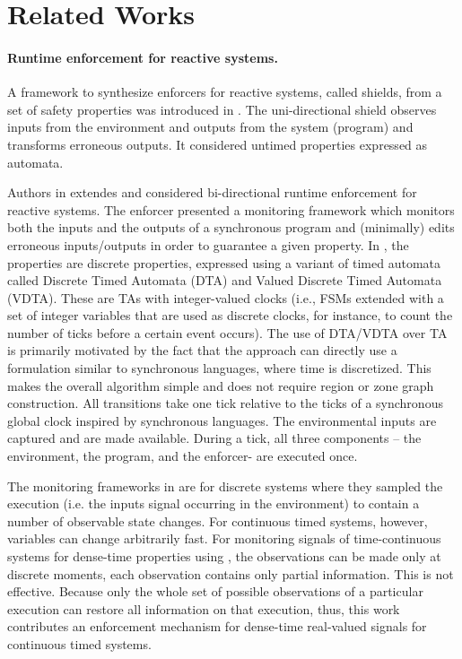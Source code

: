 \section{Related Works}
\label{sec:RL}
\paragraph{Runtime enforcement for reactive systems.}
A framework to synthesize enforcers for reactive systems, called shields, from a set of safety properties was introduced in \cite{10.1007/978-3-662-46681-0_51}. The uni-directional shield observes inputs from the environment and outputs from the system (program) and transforms erroneous outputs. It considered untimed properties expressed as automata. 

Authors in \cite{10.1145/3126500,10.1145/3092282.3092291,10.1109/TII.2019.2945520} extendes \cite{10.1007/978-3-662-46681-0_51} and considered bi-directional runtime enforcement for reactive systems. The enforcer presented a monitoring framework which monitors both the inputs and the outputs of a synchronous program and (minimally) edits erroneous inputs/outputs in order to guarantee a given property.  In \cite{10.1145/3092282.3092291,10.1109/TII.2019.2945520}, the properties are discrete properties, expressed using a variant of timed automata  %
called Discrete Timed Automata (DTA) and Valued Discrete Timed Automata (VDTA). These are TAs with integer-valued clocks (i.e., FSMs extended with a set of integer variables that are used as discrete clocks, for instance, to count the number of ticks before a certain event occurs).  The use of DTA/VDTA over TA is primarily motivated by the fact that the approach can directly use a formulation similar to synchronous languages, where time is discretized. This makes the overall algorithm simple and does not require region or zone graph construction. All transitions take one tick relative to the ticks of a synchronous global clock inspired by synchronous languages. The environmental inputs are captured %
and are made available. %
During a tick, all three components – the environment, the program, and the enforcer- are executed once. 


The monitoring frameworks in \cite{10.1145/3092282.3092291,10.1109/TII.2019.2945520} are for discrete systems where they sampled the execution (i.e. the inputs signal occurring in the environment) to contain a number of observable state changes. For continuous timed systems, however, variables can change arbitrarily fast. For monitoring signals of time-continuous systems for dense-time properties using \cite{10.1145/3092282.3092291,10.1109/TII.2019.2945520}, the observations can be made only at discrete moments, each observation contains only partial information. This is not effective. Because only the whole set of possible observations of a particular execution can restore all information on that execution, thus, this work contributes an enforcement mechanism for dense-time real-valued signals for continuous timed systems. 

